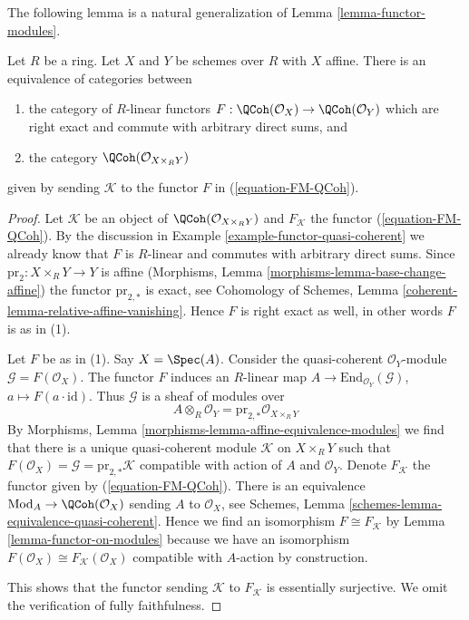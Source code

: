 \noindent
The following lemma is a natural generalization of
Lemma \ref{lemma-functor-modules}.

\begin{lemma}
\label{lemma-functor-quasi-coherent-from-affine}
Let $R$ be a ring. Let $X$ and $Y$ be schemes over $R$ with $X$ affine.
There is an equivalence of categories between
\begin{enumerate}
\item the category of $R$-linear functors
$F : \QCoh(\mathcal{O}_X) \to \QCoh(\mathcal{O}_Y)$
which are right exact and commute with arbitrary direct sums, and
\item the category $\QCoh(\mathcal{O}_{X \times_R Y})$
\end{enumerate}
given by sending $\mathcal{K}$ to the functor $F$ in (\ref{equation-FM-QCoh}).
\end{lemma}

\begin{proof}
Let $\mathcal{K}$ be an object of $\QCoh(\mathcal{O}_{X \times_R Y})$
and $F_\mathcal{K}$ the functor (\ref{equation-FM-QCoh}). By the discussion in
Example \ref{example-functor-quasi-coherent} we already know that
$F$ is $R$-linear and commutes with arbitrary direct sums.
Since $\text{pr}_2 : X \times_R Y \to Y$ is affine
(Morphisms, Lemma \ref{morphisms-lemma-base-change-affine}) the functor
$\text{pr}_{2, *}$ is exact, see Cohomology of Schemes, Lemma
\ref{coherent-lemma-relative-affine-vanishing}.
Hence $F$ is right exact as well, in other words $F$ is as in (1).

\medskip\noindent
Let $F$ be as in (1). Say $X = \Spec(A)$. Consider the quasi-coherent
$\mathcal{O}_Y$-module $\mathcal{G} = F(\mathcal{O}_X)$.
The functor $F$ induces an $R$-linear map
$A \to \text{End}_{\mathcal{O}_Y}(\mathcal{G})$,
$a \mapsto F(a \cdot \text{id})$. Thus $\mathcal{G}$ is a sheaf of modules over
$$
A \otimes_R \mathcal{O}_Y = \text{pr}_{2, *}\mathcal{O}_{X \times_R Y}
$$
By Morphisms, Lemma \ref{morphisms-lemma-affine-equivalence-modules}
we find that there is a unique quasi-coherent module $\mathcal{K}$
on $X \times_R Y$ such that $F(\mathcal{O}_X) = \mathcal{G} =
\text{pr}_{2, *}\mathcal{K}$ compatible with action
of $A$ and $\mathcal{O}_Y$. Denote $F_\mathcal{K}$ the functor
given by (\ref{equation-FM-QCoh}). There is an equivalence
$\text{Mod}_A \to \QCoh(\mathcal{O}_X)$ sending $A$ to $\mathcal{O}_X$, see
Schemes, Lemma \ref{schemes-lemma-equivalence-quasi-coherent}.
Hence we find an isomorphism $F \cong F_\mathcal{K}$ by
Lemma \ref{lemma-functor-on-modules} because we have an isomorphism
$F(\mathcal{O}_X) \cong F_\mathcal{K}(\mathcal{O}_X)$ compatible with
$A$-action by construction.

\medskip\noindent
This shows that the functor sending $\mathcal{K}$ to $F_\mathcal{K}$
is essentially surjective. We omit the verification of fully faithfulness.
\end{proof}

